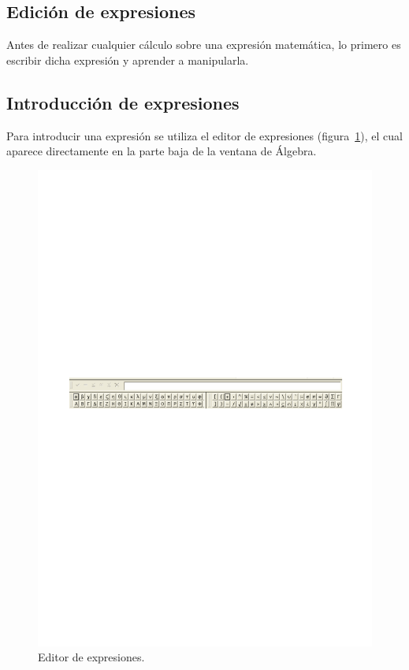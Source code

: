 \subsection*{Edición de expresiones}
Antes de realizar cualquier cálculo sobre una expresión matemática,
lo primero es escribir dicha expresión y aprender a manipularla.
\subsection*{Introducción de expresiones}
Para introducir una expresión se utiliza el editor de expresiones
(figura~\ref{g:editor}), el cual aparece directamente en la parte
baja de la ventana de Álgebra.
\begin{figure}[h!]
\begin{center}
\includegraphics[scale=0.9]{img/introduccion_derive/authorexpression}
\caption{Editor de expresiones.} \label{g:editor}
\end{center}
\end{figure}

